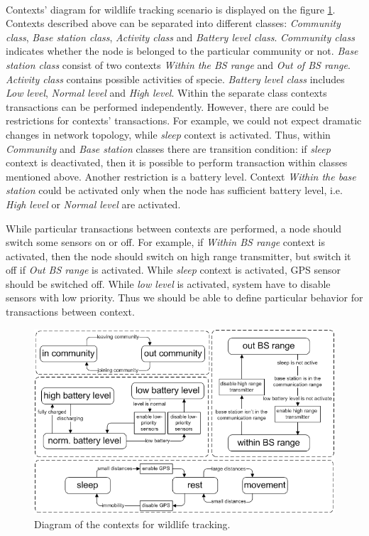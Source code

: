 \documentclass[12pt,a4paper]{article}
\begin{document}
\paragraph{}
Contexts' diagram for wildlife tracking scenario is displayed on the figure \ref{fig:wtd}. Contexts described above can be separated into different classes: \textit{Community class}, \textit{Base station class}, \textit{Activity class} and \textit{Battery level class}. \textit{Community class} indicates whether the node is belonged to the particular community or not. \textit{Base station class} consist of two contexts \textit{Within the BS range} and \textit{Out of BS range}. \textit{Activity class} contains possible activities of specie. \textit{Battery level class} includes \textit{Low level}, \textit{Normal level} and \textit{High level}. Within the separate class contexts transactions can be performed independently. However, there are could be restrictions for contexts' transactions. For example, we could not expect dramatic changes in network topology, while \textit{sleep} context is activated. Thus, within \textit{Community} and \textit{Base station} classes there are transition condition: if \textit{sleep} context is deactivated, then it is possible to perform transaction within classes mentioned above. Another restriction is a battery level. Context \textit{Within the base station} could be activated only when the node has sufficient battery level, i.e. \textit{High level} or \textit{Normal level} are activated.

While particular transactions between contexts are performed, a node should switch some sensors on or off. For example, if \textit{Within BS range} context is activated, then the node should switch on high range transmitter, but switch it off if \textit{Out BS range} is activated. While \textit{sleep} context is activated, GPS sensor should be switched off. While \textit{low level} is activated, system have to disable sensors with low priority. Thus we should be able to define particular behavior for transactions between context.

\begin{figure}[H]
\centerline{
  \includegraphics{wildlifetracking.png}
}
\caption{Diagram of the contexts for wildlife tracking.}
\label{fig:wtd}
\end{figure}
\end{document}
